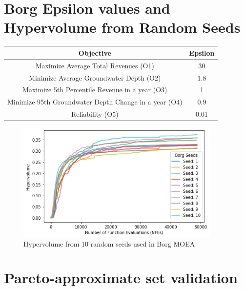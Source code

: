 \documentclass[11pt,a4paper]{article}
\begin{document}
\section{Borg Epsilon values and Hypervolume from Random Seeds}

\begin{center}
\begin{tabular}{ |c|c| }
 \hline
 Objective & Epsilon \\ 
 \hline
Maximize Average Total Revenues (O1) & 30  \\
Minimize Average Groundwater Depth (O2) & 1.8 \\
Maximize 5th Percentile Revenue in a year (O3) & 1 \\
Minimize 95th Groundwater Depth Change in a year (O4) & 0.9 \\
Reliability (O5) & 0.01 \\
\hline
\end{tabular}
\end{center}

\begin{figure}[H]
    \centering
    \includegraphics[width=0.9\textwidth]{./figs/Borg_Seeds_Hypervolume.png}
    \caption{Hypervolume from 10 random seeds used in Borg MOEA}
    \label{fig:m1esh1}
\end{figure}

\section{Pareto-approximate set validation}
\end{document}
